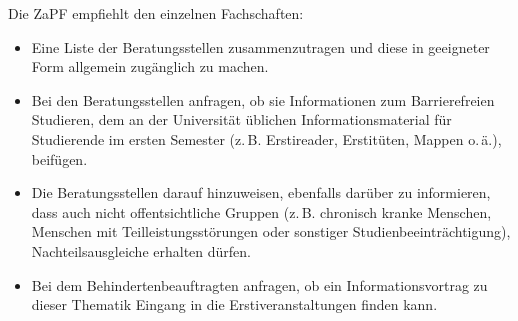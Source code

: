 Die ZaPF empfiehlt den einzelnen Fachschaften:
\begin{itemize}
\item Eine Liste der Beratungsstellen zusammenzutragen und diese in geeigneter
	Form allgemein zugänglich zu machen. 
\item Bei den Beratungsstellen anfragen, ob sie Informationen zum
	Barrierefreien Studieren, dem an der Universität üblichen
	Informationsmaterial für Studierende im ersten Semester (z.\,B.
	Erstireader, Erstitüten, Mappen o.\,ä.), beifügen.
\item Die Beratungsstellen darauf hinzuweisen, ebenfalls darüber zu
	informieren, dass auch nicht offentsichtliche Gruppen (z.\,B. chronisch
	kranke Menschen, Menschen mit Teilleistungsstörungen oder sonstiger
	Studienbeeinträchtigung), Nachteilsausgleiche erhalten dürfen.
\item Bei dem Behindertenbeauftragten anfragen, ob ein Informationsvortrag zu
	dieser Thematik Eingang in die Erstiveranstaltungen finden kann.
\end{itemize}
